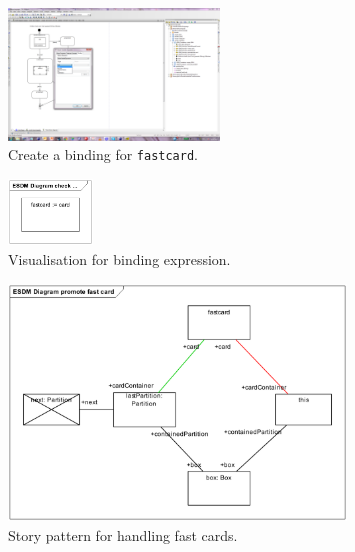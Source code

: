 \begin{figure}[htp]
\begin{center}
  \includegraphics[width=0.5\textwidth]{pics/sdmBilder/bindings/fastcard_bindingexp}
  \caption{Create a binding for \texttt{fastcard}.}  
  \label{fig:sdm_fastcard_3}
\end{center}
\end{figure}

\begin{figure}[htp]
\begin{center}
  \includegraphics[width=0.2\textwidth]{pics/sdmBilder/bindings/visual_bindingexp}
  \caption{Visualisation for binding expression.}  
  \label{fig:sdm_fastcard_4}
\end{center}
\end{figure}

\begin{figure}[htp]
\begin{center}
  \includegraphics[width=0.8\textwidth]{pics/sdmBilder/bindings/promoteFastCard}
  \caption{Story pattern for handling fast cards.}  
  \label{fig:sdm_fastcard_5}
\end{center}
\end{figure}





